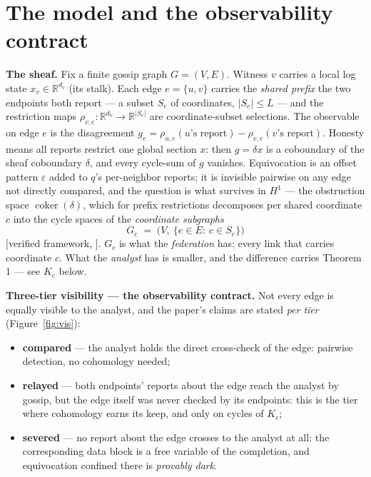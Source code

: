 \documentclass[11pt,a4paper]{article}
\begin{document}
\section{The model and the observability contract}\label{sec:model}

\textbf{The sheaf.} Fix a finite gossip graph $G=(V,E)$. Witness $v$ carries a local log state $x_v\in\mathbb{R}^{d_v}$ (its
stalk). Each edge $e=\{u,v\}$ carries the \emph{shared prefix} the two endpoints both report --- a subset $S_e$ of
coordinates, $|S_e|\le L$ --- and the restriction maps $\rho_{v,e}:\mathbb{R}^{d_v}\to\mathbb{R}^{|S_e|}$ are
coordinate-subset selections. The observable on edge $e$ is the disagreement
$g_e=\rho_{u,e}(\text{$u$'s report})-\rho_{v,e}(\text{$v$'s report})$. Honesty means all reports restrict one global section
$x$: then $g=\delta x$ is a coboundary of the sheaf coboundary $\delta$, and every cycle-sum of $g$ vanishes. Equivocation is
an offset pattern $\varepsilon$ added to $q$'s per-neighbor reports; it is invisible pairwise on any edge not directly
compared, and the question is what survives in $H^1$ --- the obstruction space $\operatorname{coker}(\delta)$, which for
prefix restrictions decomposes per shared coordinate $c$ into the cycle spaces of the \emph{coordinate subgraphs}
\[
G_c \;=\; \bigl(V,\ \{e\in E:\ c\in S_e\}\bigr)
\]
[verified framework, \cite{curry,hansen-ghrist}]. $G_c$ is what the \emph{federation} has: every link that carries
coordinate $c$. What the \emph{analyst} has is smaller, and the difference carries Theorem 1 --- see $K_c$ below.

\textbf{Three-tier visibility --- the observability contract.} Not every edge is equally visible to the analyst, and the
paper's claims are stated \emph{per tier} (Figure~\ref{fig:vis}):
\begin{itemize}
\item \textbf{compared} --- the analyst holds the direct cross-check of the edge: pairwise detection, no cohomology needed;
\item \textbf{relayed} --- both endpoints' reports about the edge reach the analyst by gossip, but the edge itself was never
checked by its endpoints: this is the tier where cohomology earns its keep, and only on cycles of $K_c$;
\item \textbf{severed} --- no report about the edge crosses to the analyst at all: the corresponding data block is a free
variable of the completion, and equivocation confined there is \emph{provably dark}.
\end{itemize}
\end{document}
